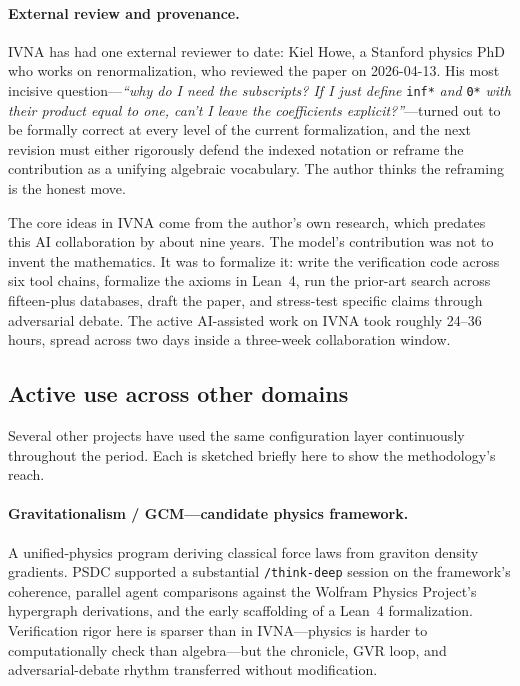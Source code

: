 \documentclass[12pt]{article}
\begin{document}
\paragraph{External review and provenance.} IVNA has had one external reviewer to date: Kiel Howe, a Stanford physics PhD who works on renormalization, who reviewed the paper on 2026-04-13. His most incisive question---\textit{``why do I need the subscripts? If I just define} \texttt{inf*} \textit{and} \texttt{0*} \textit{with their product equal to one, can't I leave the coefficients explicit?''}---turned out to be formally correct at every level of the current formalization, and the next revision must either rigorously defend the indexed notation or reframe the contribution as a unifying algebraic vocabulary. The author thinks the reframing is the honest move.

The core ideas in IVNA come from the author's own research, which predates this AI collaboration by about nine years. The model's contribution was not to invent the mathematics. It was to formalize it: write the verification code across six tool chains, formalize the axioms in Lean~4, run the prior-art search across fifteen-plus databases, draft the paper, and stress-test specific claims through adversarial debate. The active AI-assisted work on IVNA took roughly 24--36 hours, spread across two days inside a three-week collaboration window.

\subsection{Active use across other domains}
\label{subsec:other-domains}

Several other projects have used the same configuration layer continuously throughout the period. Each is sketched briefly here to show the methodology's reach.

\paragraph{Gravitationalism / GCM---candidate physics framework.} A unified-physics program deriving classical force laws from graviton density gradients. PSDC supported a substantial \texttt{/think-deep} session on the framework's coherence, parallel agent comparisons against the Wolfram Physics Project's hypergraph derivations, and the early scaffolding of a Lean~4 formalization. Verification rigor here is sparser than in IVNA---physics is harder to computationally check than algebra---but the chronicle, GVR loop, and adversarial-debate rhythm transferred without modification.
\end{document}
